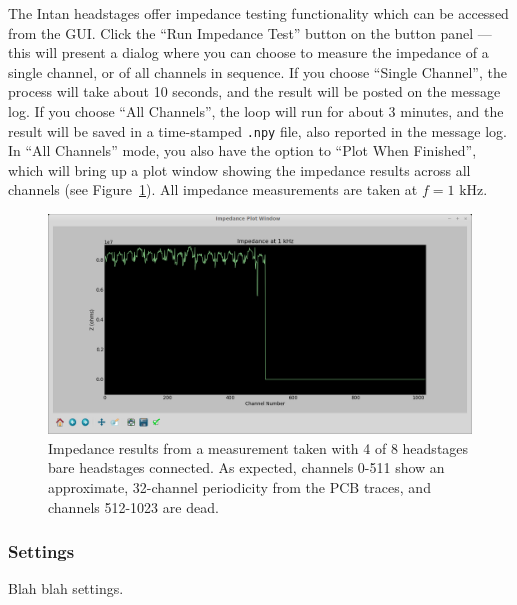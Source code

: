 The Intan headstages offer impedance testing functionality which can be accessed from the GUI. Click the ``Run Impedance Test'' button on the button panel --- this will present a dialog where you can choose to measure the impedance of a single channel, or of all channels in sequence. If you choose ``Single Channel'', the process will take about 10 seconds, and the result will be posted on the message log. If you choose ``All Channels'', the loop will run for about 3 minutes, and the result will be saved in a time-stamped \texttt{.npy} file, also reported in the message log. In ``All Channels'' mode, you also have the option to ``Plot When Finished'', which will bring up a plot window showing the impedance results across all channels (see Figure~\ref{fig_impedance}). All impedance measurements are taken at $f = 1\text{ kHz}$.

\begin{figure}[h!]
\begin{center}
\includegraphics[width=15cm]{screenshots/impedance.png}
\end{center}
\caption{Impedance results from a measurement taken with 4 of 8 headstages bare headstages connected. As expected, channels 0-511 show an approximate, 32-channel periodicity from the PCB traces, and channels 512-1023 are dead.}
\label{fig_impedance}
\end{figure}

\subsubsection{Settings}
\label{sec_usage_buttonpanel_settings}

Blah blah settings.









